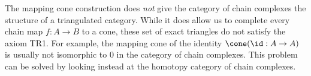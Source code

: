 
The mapping cone construction does \emph{not} give the category of chain complexes the structure of a triangulated category. While it does allow us to complete every chain map $f: A\to B$ to a cone, these set of exact triangles do not satisfy the axiom TR1. For example, the mapping cone of the identity $\cone(\id: A\to A)$ is usually not isomorphic to $0$ in the category of chain complexes. This problem can be solved by looking instead at the homotopy category of chain complexes.